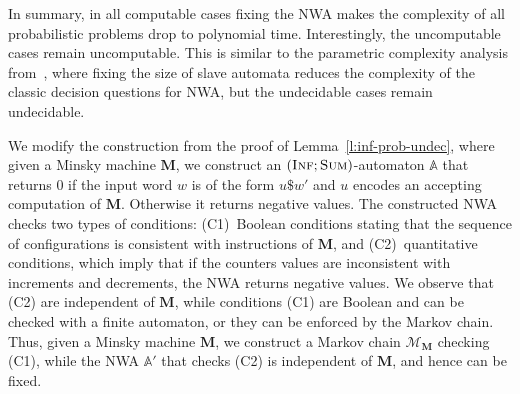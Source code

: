 \documentclass{lmcs}
\newcommand{\proofideas}{\smallskip\noindent{\emph{The key ideas.}}}
\newcommand{\nestedA}{\mathbb{A}}
\newcommand{\fsum}{\textsc{Sum}}
\newcommand{\finf}{\textsc{Inf}}
\newcommand{\markov}{\mathcal{M}}
\newcommand{\M}{\mathbf{M}}
\begin{document}
\noindent
In summary, in all computable cases fixing the NWA makes the complexity of all probabilistic problems drop to polynomial time.
Interestingly, the uncomputable cases remain uncomputable.
This is similar to the parametric complexity analysis from~\cite{nested}, where fixing the size of slave automata reduces the complexity of the classic decision questions for NWA, but the undecidable cases remain undecidable.

\proofideas{}
We modify the construction from the proof of Lemma~\ref{l:inf-prob-undec}, where given a Minsky machine $\M$,
we construct an $(\finf;\fsum)$-automaton $\nestedA$ that returns $0$ if the input word $w$ is of the form $u \$ w'$
and $u$ encodes an accepting computation of $\M$. Otherwise it returns negative values.
The constructed NWA checks two types of conditions:
(C1)~Boolean conditions stating that the sequence of configurations is consistent with instructions of $\M$, and
(C2)~quantitative conditions, which imply that if the counters values are inconsistent with increments and decrements, the NWA returns negative values.
We observe that (C2) are independent of $\M$, while conditions (C1) are Boolean and can be checked with a finite automaton, or they can be enforced by the Markov chain.
Thus, given a Minsky machine $\M$, we construct a Markov chain $\markov_{\M}$ checking (C1), while the NWA $\nestedA'$ that checks (C2) is independent of $\M$, and hence can be fixed.
\end{document}
